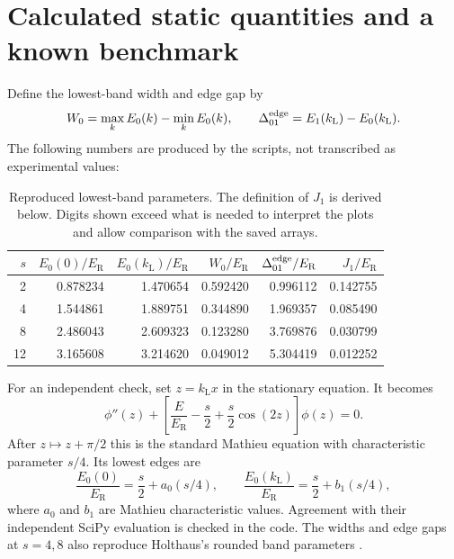 \documentclass[11pt,oneside]{report}
\numberwithin{equation}{chapter}
\newcommand{\ER}{E_{\mathrm R}}
\begin{document}
\section{Calculated static quantities and a known benchmark}
Define the lowest-band width and edge gap by
\begin{equation}
 W_0=\max_k E_0(k)-\min_k E_0(k),\qquad \Delta_{01}^{\rm edge}=E_1(k_{\mathrm L})-E_0(k_{\mathrm L}).
\end{equation}
The following numbers are produced by the scripts, not transcribed as experimental values:
\begin{table}[!htbp]\centering\small
\begin{tabular}{rrrrrr}\toprule
$s$&$E_0(0)/\ER$&$E_0(k_{\mathrm L})/\ER$&$W_0/\ER$&$\Delta_{01}^{\rm edge}/\ER$&$J_1/\ER$\\\midrule
2&0.878234&1.470654&0.592420&0.996112&0.142755\\
4&1.544861&1.889751&0.344890&1.969357&0.085490\\
8&2.486043&2.609323&0.123280&3.769876&0.030799\\
12&3.165608&3.214620&0.049012&5.304419&0.012252\\\bottomrule
\end{tabular}
\caption{Reproduced lowest-band parameters. The definition of $J_1$ is derived below. Digits shown exceed what is needed to interpret the plots and allow comparison with the saved arrays.}
\label{tab:static}\end{table}
For an independent check, set $z=k_{\mathrm L}x$ in the stationary equation. It becomes
\begin{equation}
 \phi''(z)+\left[\frac{E}{\ER}-\frac{s}{2}+\frac{s}{2}\cos(2z)\right]\phi(z)=0.
\end{equation}
After $z\mapsto z+\pi/2$ this is the standard Mathieu equation with characteristic parameter $s/4$. Its lowest edges are
\begin{equation}
 \frac{E_0(0)}{\ER}=\frac{s}{2}+a_0(s/4),\qquad
 \frac{E_0(k_{\mathrm L})}{\ER}=\frac{s}{2}+b_1(s/4),
\end{equation}
where $a_0$ and $b_1$ are Mathieu characteristic values. Agreement with their independent SciPy evaluation is checked in the code. The widths and edge gaps at $s=4,8$ also reproduce Holthaus's rounded band parameters \cite{Holthaus2016}.
\end{document}
